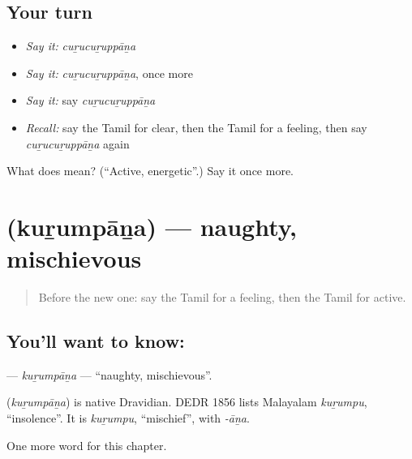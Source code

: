 \subsection*{Your turn}
\begin{itemize}
\raggedright
  \item \emph{Say it:} \emph{cuṟucuṟuppāṉa}
  \item \emph{Say it:} \emph{cuṟucuṟuppāṉa}, once more
  \item \emph{Say it:} say \emph{cuṟucuṟuppāṉa}
  \item \emph{Recall:} say the Tamil for clear, then the Tamil for a feeling, then say \emph{cuṟucuṟuppāṉa} again
\end{itemize}

\begin{tcolorbox}[breakable,colback=teal!4,colframe=teal!35!black,title={Before you move on}]
What does  mean? (\textquotedblleft{}Active, energetic\textquotedblright{}.) Say it once more.
\end{tcolorbox}
\section[\texorpdfstring{\ta{குறும்பான} (kuṟumpāṉa)}{குறும்பான (kuṟumpāṉa)}]{ (kuṟumpāṉa) — naughty, mischievous}

\label{lesson:TA-C180-kurumpana}



\begin{quote}
Before the new one: say the Tamil for a feeling, then the Tamil for active.
\end{quote}

\subsection*{You'll want to know: }
\textbf{} — \emph{kuṟumpāṉa} — \textquotedblleft{}naughty, mischievous\textquotedblright{}.

\begin{cousinweb}
\textbf{} (\emph{kuṟumpāṉa}) is native Dravidian. DEDR 1856 lists Malayalam \emph{kuṟumpu}, \textquotedblleft{}insolence\textquotedblright{}. It is \emph{kuṟumpu}, \textquotedblleft{}mischief\textquotedblright{}, with \emph{-āṉa}.
\end{cousinweb}

\begin{grammarlens}[title={What you've built}]
One more word for this chapter.
\end{grammarlens}

